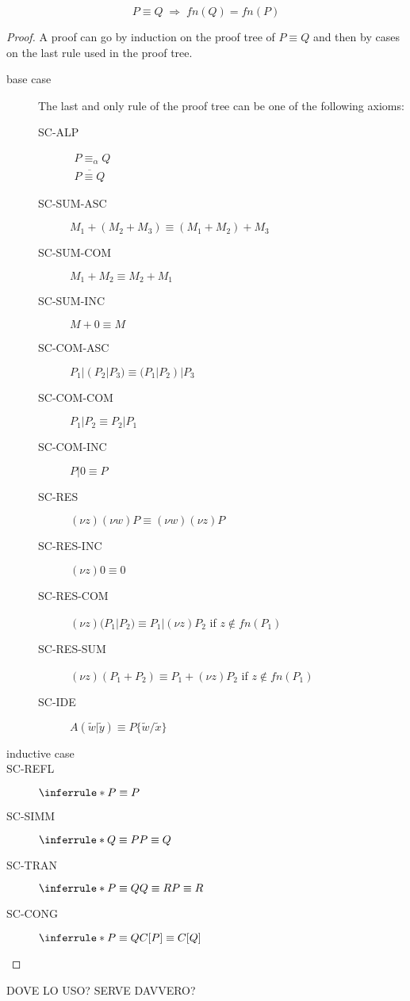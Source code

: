 \begin{lemma}
\[
  P\equiv Q\; \Rightarrow\; fn(Q)= fn(P)
\]
  \begin{proof}
    A proof can go by induction on the proof tree of $P\equiv Q$ and then by cases on the last rule used in the proof tree. 
    \begin{description}
      \item[base case]
	The last and only rule of the proof tree can be one of the following axioms:
	\begin{description}
	  \item[SC-ALP]$\begin{array}{c}P \equiv_{\alpha} Q\\\overline{P\equiv Q}\end{array}$
	  \item[SC-SUM-ASC] $M_{1}+(M_{2}+M_{3})\equiv (M_{1}+M_{2})+M_{3}$ 
	  \item[SC-SUM-COM] $M_{1}+M_{2}\equiv M_{2}+M_{1}$ 
	  \item[SC-SUM-INC] $M+0\equiv M$
	  \item[SC-COM-ASC] $P_{1}|(P_{2}|P_{3})\equiv (P_{1}|P_{2})|P_{3}$ 
	  \item[SC-COM-COM] $P_{1}|P_{2}\equiv P_{2}|P_{1}$ 	
	  \item[SC-COM-INC] $P|0\equiv P$
	  \item[SC-RES] $(\nu z) (\nu w) P \equiv (\nu w) (\nu z) P$ 
	  \item[SC-RES-INC] $(\nu z) 0 \equiv 0$ 
	  \item[SC-RES-COM] $(\nu z) (P_{1}|P_{2}) \equiv P_{1}|(\nu z) P_{2}$ if $z\notin fn(P_{1})$
	  \item[SC-RES-SUM] $(\nu z) (P_{1}+P_{2}) \equiv P_{1}+(\nu z) P_{2}$ if $z\notin fn(P_{1})$
	  \item[SC-IDE]$A(\tilde{w}|\tilde{y})\equiv P\{\tilde{w}/\tilde{x}\}$
	\end{description}
      \item[inductive case]
	\item[SC-REFL] $\inferrule*{}{P\equiv P}$
	\item[SC-SIMM] $\inferrule*{Q\equiv P}{P\equiv Q}$
	\item[SC-TRAN] $\inferrule*{P\equiv Q \\ Q\equiv R}{P\equiv R}$
	\item[SC-CONG] $\inferrule*{P\equiv Q}{C[P]\equiv C[Q]}$
    \end{description}
  \end{proof}
\end{lemma}
DOVE LO USO? SERVE DAVVERO?

